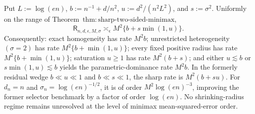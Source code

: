 Put \(L:=\log(en)\), \(b:=n^{-1}+d/n^2\), \(u:=d^2/(n^2L^2)\), and \(s:=\sigma^2\).  Uniformly on the range of Theorem~\(\mathrm{thm:sharp\text{-}two\text{-}sided\text{-}minimax}\),
\[
 \mathsf R_{n,d,\epsilon,M,\sigma}
 \asymp_{\epsilon}M^2\{b+s\min(1,u)\}.
\]
Consequently: exact homogeneity has rate \(M^2b\); unrestricted heterogeneity \((\sigma=2)\) has rate \(M^2\{b+\min(1,u)\}\); every fixed positive radius has rate \(M^2\{b+\min(1,u)\}\); saturation \(u\ge1\) has rate \(M^2(b+s)\); and either \(u\lesssim b\) or \(s\min(1,u)\lesssim b\) yields the parametric-dominance rate \(M^2b\).  In the formerly residual wedge \(b\ll u\ll1\) and \(b\ll s\ll1\), the sharp rate is \(M^2(b+su)\).  For \(d_n=n\) and \(\sigma_n=\log(en)^{-1/2}\), it is of order \(M^2\log(en)^{-3}\), improving the former selector benchmark by a factor of order \(\log(en)\).  No shrinking-radius regime remains unresolved at the level of minimax mean-squared-error order.